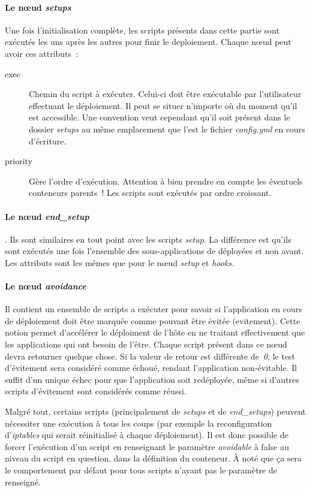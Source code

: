 \paragraph{Le nœud \emph{setups}}
Une fois l'\gls{initialisation} complète, les scripts présents dans cette partie sont exécutés les uns après les autres pour finir le \gls{deploiement}.
Chaque nœud peut avoir ces attributs~:
\begin{description}
	\item[exec] Chemin du script à exécuter. Celui-ci doit être exécutable par l'utilisateur effectuant le déploiement. Il peut se situer n'importe où du moment qu'il est accessible. Une convention veut cependant qu'il soit présent dans le dossier \emph{setups} au même emplacement que l'est le fichier \emph{config.yml} en cours d'écriture.
	\item[priority] Gère l'ordre d'exécution. Attention à bien prendre en compte les éventuels conteneurs parents~! Les scripts sont exécutés par ordre croissant.
\end{description}

\paragraph{Le nœud \emph{end\_setup}}. Ils sont similaires en tout point avec les scripts \emph{setup}. La différence est qu'ils sont exécutés une fois l'ensemble des sous-applications de déployées et non avant.
Les attributs sont les mêmes que pour le nœud \emph{setup} et \emph{hooks}.

\paragraph{Le nœud \emph{avoidance}}
Il contient un ensemble de scripts a exécuter pour savoir si l'application en cours de déploiement doit être marquée comme pouvant être évitée (\gls{evitement}).
Cette notion permet d'accélérer le déploiment de l'hôte en ne traitant effectivement que les applications qui ont besoin de l'être.
Chaque script présent dans ce nœud devra retourner quelque chose. Si la valeur de retour est différente de~\emph{0}, le test d'évitement sera considéré comme échoué, rendant l'application non-évitable.
Il suffit d'un unique échec pour que l'application soit redéployée, même si d'autres scripts d'évitement sont considérés comme réussi.

Malgré tout, certains scripts (principalement de \emph{setups} et de \emph{end\_setups}) peuvent nécessiter une exécution à tous les coups (par exemple la reconfiguration d'\emph{iptables} qui serait réinitialisé à chaque déploiement).
Il est donc possible de forcer l'exécution d'un script en renseignant le paramètre \emph{avoidable} à {false} au niveau du script en question, dans la définition du conteneur.
À noté que ça sera le comportement par défaut pour tous scripts n'ayant pas le paramètre de renseigné.

